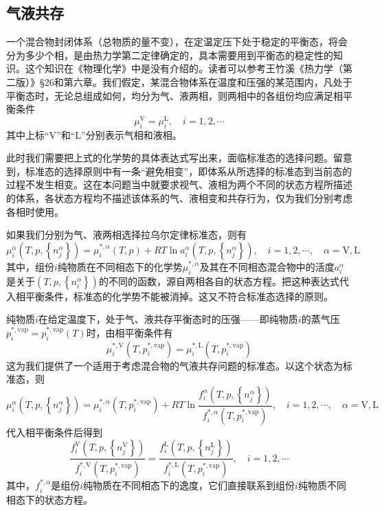\documentclass[main.tex]{subfiles}
\begin{document}
\subsection{气液共存}
一个混合物封闭体系（总物质的量不变），在定温定压下处于稳定的平衡态，将会分为多少个相，是由热力学第二定律确定的，具本需要用到平衡态的稳定性的知识。这个知识在《物理化学》中是没有介绍的。读者可以参考王竹溪《热力学（第二版）》\S26和第六章。我们假定，某混合物体系在温度和压强的某范围内，凡处于平衡态时，无论总组成如何，均分为气、液两相，则两相中的各组份均应满足相平衡条件
\[\mu_i^\text{V}=\mu_i^\text{L},\quad i=1,2,\cdots\]
其中上标“V”和“L”分别表示气相和液相。

此时我们需要把上式的化学势的具体表达式写出来，面临标准态的选择问题。留意到，标准态的选择原则中有一条“避免相变”，即体系从所选择的标准态到当前态的过程不发生相变。这在本问题当中就要求视气、液相为两个不同的状态方程所描述的体系，各状态方程均不描述该体系的气、液相变和共存行为，仅为我们分别考虑各相时使用。

如果我们分别为气、液两相选择拉乌尔定律标准态，则有
\begin{equation*}
    \mu_i^\alpha\left(T,p,\left\{n_j^\alpha\right\}\right)=\mu_i^{*,\alpha}\left(T,p\right)+RT\ln a_i^\alpha\left(T,p,\left\{n_j^\alpha\right\}\right),\quad i=1,2,\cdots,\quad \alpha=\text{V},\text{L}
\end{equation*}
其中，组份$i$纯物质在不同相态下的化学势$\mu_i^{*,\alpha}$及其在不同相态混合物中的活度$a_i^\alpha$是关于$\left(T,p,\left\{n_i^\alpha\right\}\right)$的不同的函数，源自两相各自的状态方程。把这种表达式代入相平衡条件，标准态的化学势不能被消掉。这又不符合标准态选择的原则。

纯物质$i$在给定温度下，处于气、液共存平衡态时的压强——即纯物质$i$的蒸气压$p_i^{*,\text{vap}}=p_i^{*,\text{vap}}\left(T\right)$时，由相平衡条件有
\[\mu_i^{*,\text{V}}\left(T,p_i^{*,\text{vap}}\right)=\mu_i^{*,\text{L}}\left(T,p_i^{*,\text{vap}}\right)\]
这为我们提供了一个适用于考虑混合物的气液共存问题的标准态。以这个状态为标准态，则
\begin{equation*}
    \mu_i^\alpha\left(T,p,\left\{n_j^\alpha\right\}\right)=\mu_i^{*,\alpha}\left(T,p_i^{*,\text{vap}}\right)+RT\ln\frac{f_i^\alpha\left(T,p,\left\{n_j^\alpha\right\}\right)}{f_i^{*,\alpha}\left(T,p_i^{*,\text{vap}}\right)},\quad i=1,2,\cdots,\quad\alpha=\text{V},\text{L}
\end{equation*}
代入相平衡条件后得到
\[\frac{f_i^\text{V}\left(T,p,\left\{n_j^\text{V}\right\}\right)}{f_i^{*,\text{V}}\left(T,p_i^{*,\text{vap}}\right)}=\frac{f_i^\text{L}\left(T,p,\left\{n_j^\text{L}\right\}\right)}{f_i^{*,\text{L}}\left(T,p_i^{*,\text{vap}}\right)},\quad i=1,2,\cdots\]
其中，$f_i^{*,\alpha}$是组份$i$纯物质在不同相态下的逸度，它们直接联系到组份$i$纯物质不同相态下的状态方程。
\end{document}
